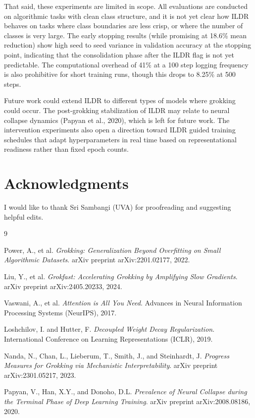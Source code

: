 \documentclass{article}
\begin{document}
\vspace{3pt}

That said, these experiments are limited in scope. All evaluations are conducted on algorithmic tasks with clean class structure, and it is not yet clear how ILDR behaves on tasks where class boundaries are less crisp, or where the number of classes is very large. The early stopping results (while promising at 18.6\% mean reduction) show high seed to seed variance in validation accuracy at the stopping point, indicating that the consolidation phase after the ILDR flag is not yet predictable. The computational overhead of 41\% at a 100 step logging frequency is also prohibitive for short training runs, though this drops to 8.25\% at 500 steps.


\vspace{3pt}


Future work could extend ILDR to different types of models where grokking could occur. The post-grokking stabilization of ILDR may relate to neural collapse dynamics (Papyan et al., 2020), which is left for future work. The intervention experiments also open a direction toward ILDR guided training schedules that adapt hyperparameters in real time based on representational readiness rather than fixed epoch counts. 




\section{Acknowledgments}

I would like to thank Sri Sambangi (UVA) for proofreading and suggesting helpful edits.


\begin{thebibliography}{9}

Power, A., et al.
\textit{Grokking: Generalization Beyond Overfitting on Small Algorithmic Datasets}.
arXiv preprint arXiv:2201.02177, 2022.

Liu, Y., et al.
\textit{Grokfast: Accelerating Grokking by Amplifying Slow Gradients}.
arXiv preprint arXiv:2405.20233, 2024.

Vaswani, A., et al.
\textit{Attention is All You Need}.
Advances in Neural Information Processing Systems (NeurIPS), 2017.

Loshchilov, I. and Hutter, F.
\textit{Decoupled Weight Decay Regularization}.
International Conference on Learning Representations (ICLR), 2019.

Nanda, N., Chan, L., Lieberum, T., Smith, J., and Steinhardt, J.
\textit{Progress Measures for Grokking via Mechanistic Interpretability}.
arXiv preprint arXiv:2301.05217, 2023.

Papyan, V., Han, X.Y., and Donoho, D.L.
\textit{Prevalence of Neural Collapse during the Terminal Phase of Deep Learning Training}.
arXiv preprint arXiv:2008.08186, 2020.

\end{thebibliography}
\end{document}
